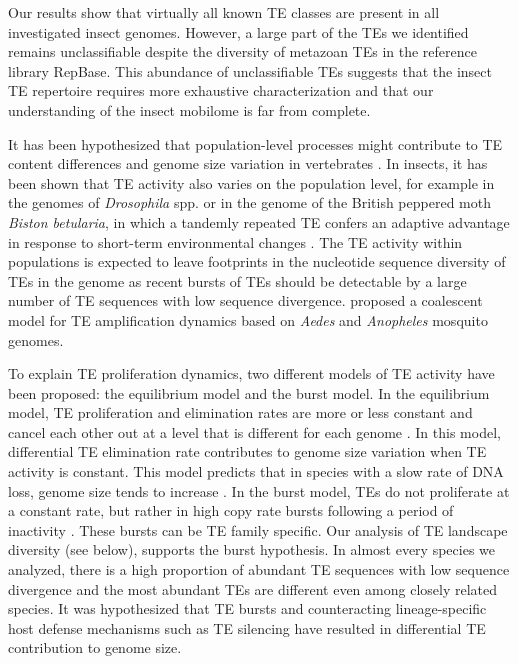 Our results show that virtually all known TE classes are present in all
investigated insect genomes.  However, a large part of the TEs we
identified remains unclassifiable despite the diversity of metazoan TEs
in the reference library RepBase.  This abundance of unclassifiable TEs
suggests that the insect TE repertoire requires more exhaustive
characterization and that our understanding of the insect mobilome is
far from complete.

It has been hypothesized that population-level processes might
contribute to TE content differences and genome size variation in
vertebrates \citep{Lynch2003}. In insects, it has been shown that TE
activity also varies on the population level, for example in the genomes
of \emph{Drosophila} spp. \citep{Perrat2013,Li2013,Blumenstiel2013} or
in the genome of the British peppered moth \emph{Biston betularia}, in
which a tandemly repeated TE confers an adaptive advantage in response
to short-term environmental changes \citep{Hof2016}. The TE activity
within populations is expected to leave footprints in the nucleotide
sequence diversity of TEs in the genome as recent bursts of TEs should
be detectable by a large number of TE sequences with low sequence
divergence. \citet{Struchiner2009} proposed a coalescent model for TE
amplification dynamics based on \emph{Aedes} and \emph{Anopheles}
mosquito genomes.



To explain TE proliferation dynamics, two different models of TE
activity have been proposed: the equilibrium model and the burst model.
In the equilibrium model, TE proliferation and elimination rates are
more or less constant and cancel each other out at a level that is
different for each genome \citep{Charlesworth1983}. In this model,
differential TE elimination rate contributes to genome size variation
when TE activity is constant. This model predicts that in species with a
slow rate of DNA loss, genome size tends to increase
\citep{Petrov2010,Sun2011}.  In the burst model, TEs do not proliferate
at a constant rate, but rather in high copy rate bursts following a
period of inactivity \citep{Blumenstiel2013}. These bursts can be TE
family specific. Our analysis of TE landscape diversity (see below),
supports the burst hypothesis. In almost every species we analyzed,
there is a high proportion of abundant TE sequences with low sequence
divergence and the most abundant TEs are different even among closely
related species. It was hypothesized that TE bursts and counteracting
lineage-specific host defense mechanisms such as TE silencing
\citep{LeRouzic2006} have resulted in differential TE contribution to
genome size.

